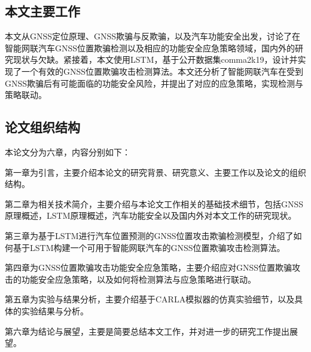 \subsection{本文主要工作}
本文从GNSS定位原理、GNSS欺骗与反欺骗，以及汽车功能安全出发，讨论了在智能网联汽车GNSS位置欺骗检测以及相应的功能安全应急策略领域，国内外的研究现状与欠缺。紧接着，本文使用LSTM，基于公开数据集comma2k19，设计并实现了一个有效的GNSS位置欺骗攻击检测算法。本文还分析了智能网联汽车在受到GNSS欺骗后有可能面临的功能安全风险，并提出了对应的应急策略，实现检测与策略联动。

\subsection{论文组织结构}
本论文分为六章，内容分别如下：

第一章为引言，主要介绍本论文的研究背景、研究意义、主要工作以及论文的组织结构。

第二章为相关技术简介，主要介绍与本论文工作相关的基础技术细节，包括GNSS原理概述，LSTM原理概述，汽车功能安全以及国内外对本文工作的研究现状。

第三章为基于LSTM进行汽车位置预测的GNSS位置攻击欺骗检测模型，介绍了如何基于LSTM构建一个可用于智能网联汽车的GNSS位置欺骗攻击检测算法。

第四章为GNSS位置欺骗攻击功能安全应急策略，主要介绍应对GNSS位置欺骗攻击的功能安全应急策略，以及如何将检测算法与应急策略进行联动。

第五章为实验与结果分析，主要介绍基于CARLA模拟器的仿真实验细节，以及具体的实验结果与分析。

第六章为结论与展望，主要是简要总结本文工作，并对进一步的研究工作提出展望。
